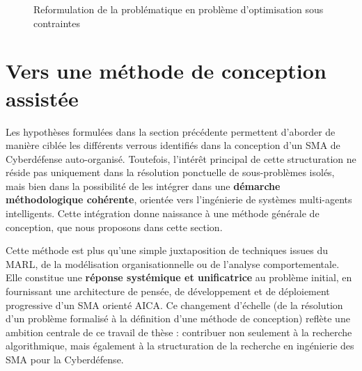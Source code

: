 \begin{figure}[H]
    \centering
    \resizebox{\textwidth}{!}{%
        
    }
    \caption{Reformulation de la problématique en problème d'optimisation sous contraintes}
    \label{fig:constrained_optimization_overview}
\end{figure}

\section{Vers une méthode de conception assistée}\label{sec:method-response}


Les hypothèses formulées dans la section précédente permettent d'aborder de manière ciblée les différents verrous identifiés dans la conception d'un \ac{SMA} de Cyberdéfense auto-organisé. Toutefois, l'intérêt principal de cette structuration ne réside pas uniquement dans la résolution ponctuelle de sous-problèmes isolés, mais bien dans la possibilité de les intégrer dans une \textbf{démarche méthodologique cohérente}, orientée vers l'ingénierie de systèmes multi-agents intelligents. Cette intégration donne naissance à une méthode générale de conception, que nous proposons dans cette section.

Cette méthode est plus qu'une simple juxtaposition de techniques issues du \ac{MARL}, de la modélisation organisationnelle ou de l'analyse comportementale. Elle constitue une \textbf{réponse systémique et unificatrice} au problème initial, en fournissant une architecture de pensée, de développement et de déploiement progressive d'un \ac{SMA} orienté \ac{AICA}. Ce changement d'échelle (de la résolution d'un problème formalisé à la définition d'une méthode de conception) reflète une ambition centrale de ce travail de thèse : contribuer non seulement à la recherche algorithmique, mais également à la structuration de la recherche en ingénierie des \ac{SMA} pour la Cyberdéfense.

